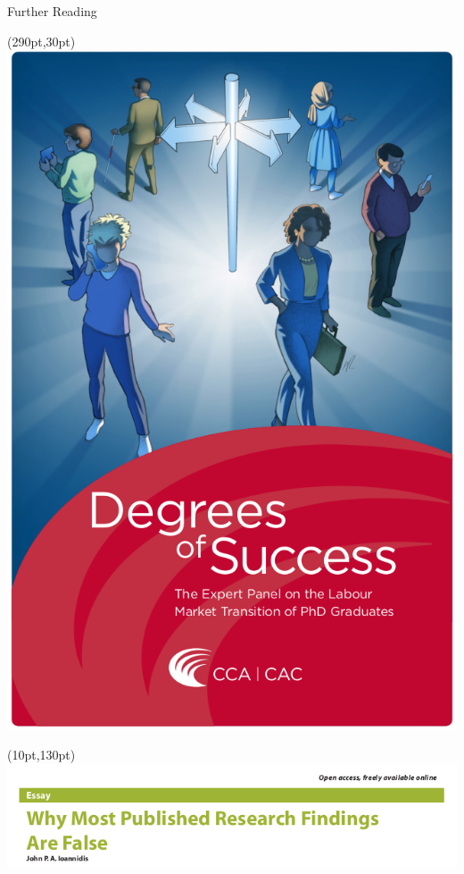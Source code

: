 \documentclass{beamer}
\begin{document}
\begin{frame}{Further Reading}
	\begin{textblock*}{60pt}(290pt,30pt)
		\includegraphics[width=1\textwidth]{../images/degreesofsuccess.png}
	\end{textblock*}

	\begin{textblock*}{190pt}(10pt,130pt)
		\includegraphics[width=1\textwidth]{../images/moststudiesfalse.png}
	\end{textblock*}


\end{frame}
\end{document}
